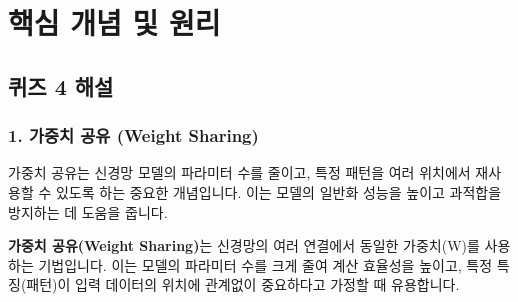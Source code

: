 \documentclass[11pt,a4paper]{article}
\theoremstyle{definition}
\newcommand{\newsection}[1]{\newpage\section{#1}}
\begin{document}
\newsection{핵심 개념 및 원리}

\subsection{퀴즈 4 해설}

\subsubsection{1. 가중치 공유 (Weight Sharing)}
가중치 공유는 신경망 모델의 파라미터 수를 줄이고, 특정 패턴을 여러 위치에서 재사용할 수 있도록 하는 중요한 개념입니다. 이는 모델의 일반화 성능을 높이고 과적합을 방지하는 데 도움을 줍니다.

\begin{tcolorbox}[summarybox, title=가중치 공유의 개념]
\textbf{가중치 공유(Weight Sharing)}는 신경망의 여러 연결에서 동일한 가중치(W)를 사용하는 기법입니다.
이는 모델의 파라미터 수를 크게 줄여 계산 효율성을 높이고, 특정 특징(패턴)이 입력 데이터의 위치에 관계없이 중요하다고 가정할 때 유용합니다.
\end{tcolorbox}
\end{document}
